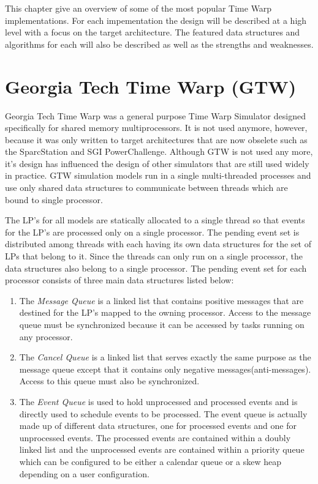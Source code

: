 \documentclass[11pt]{book}
\begin{document}
This chapter give an overview of some of the most popular Time Warp implementations. For each
impementation the design will be described at a high level with a focus on the target
architecture. The featured data structures and algorithms for each will also be described
as well as the strengths and weaknesses.

\section{Georgia Tech Time Warp (GTW)}

Georgia Tech Time Warp was a general purpose Time Warp Simulator designed specifically for
shared memory multiprocessors. It is not used anymore, however, because it was only written
to target architectures that are now obselete such as the SparcStation and SGI PowerChallenge.
Although GTW is not used any more, it's design has influenced the design of other simulators that
are still used widely in practice. GTW simulation models run in a single multi-threaded processes
and use only shared data structures to communicate between threads which are bound to single processor.

The LP's for all models are statically allocated to a single thread so that events for the
LP's are processed only on a single processor. The pending event set is distributed among
threads with each having its own data structures for the set of LPs that belong to it.
Since the threads can only run on a single processor, the data structures also belong to a
single processor. The pending event set for each processor consists of three main data structures
listed below\cite{das-94}:

\begin{enumerate}
    \item The \emph{Message Queue} is a linked list that contains positive messages that
        are destined for the LP's mapped to the owning processor. Access to the message
        queue must be synchronized because it can be accessed by tasks running on any processor.
    \item The \emph{Cancel Queue} is a linked list that serves exactly the same purpose as
        the message queue except that it contains only negative messages(anti-messages).
        Access to this queue must also be synchronized.
    \item The \emph{Event Queue} is used to hold unprocessed and processed events and is
        directly used to schedule events to be processed. The event queue is actually made
        up of different data structures, one for processed events and one for unprocessed
        events. The processed events are contained within a doubly linked list and the
        unprocessed events are contained within a priority queue which can be configured to
        be either a calendar queue or a skew heap depending on a user configuration.
\end{enumerate}
\end{document}
